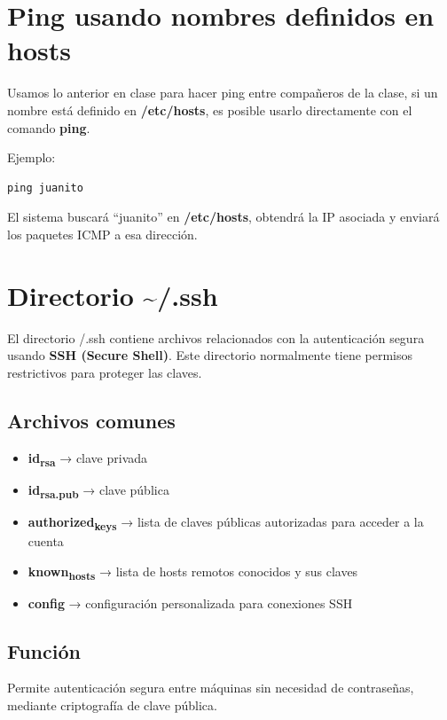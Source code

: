 \documentclass[11pt, letterpaper]{article}
\begin{document}
\section{Ping usando nombres definidos en hosts}
\label{sec:orgccbb46e}

Usamos lo anterior en clase para hacer ping entre compañeros de la clase, si un nombre está definido en \textbf{/etc/hosts}, 
es posible usarlo directamente con el comando \textbf{ping}.

Ejemplo:

\begin{verbatim}
ping juanito
\end{verbatim}

El sistema buscará ``juanito'' en \textbf{/etc/hosts}, obtendrá la IP asociada y enviará los paquetes ICMP a esa dirección.
\section{Directorio \textasciitilde{}/.ssh}
\label{sec:orgcdac668}

El directorio /.ssh contiene archivos relacionados con la autenticación segura usando \textbf{SSH (Secure Shell)}.
Este directorio normalmente tiene permisos restrictivos para proteger las claves.
\subsection{Archivos comunes}
\label{sec:orga166107}

\begin{itemize}
\item \textbf{id\textsubscript{rsa}} → clave privada
\item \textbf{id\textsubscript{rsa.pub}} → clave pública
\item \textbf{authorized\textsubscript{keys}} → lista de claves públicas autorizadas para acceder a la cuenta
\item \textbf{known\textsubscript{hosts}} → lista de hosts remotos conocidos y sus claves
\item \textbf{config} → configuración personalizada para conexiones SSH
\end{itemize}
\subsection{Función}
\label{sec:org2cc610b}

Permite autenticación segura entre máquinas sin necesidad de contraseñas,
mediante criptografía de clave pública.
\end{document}
